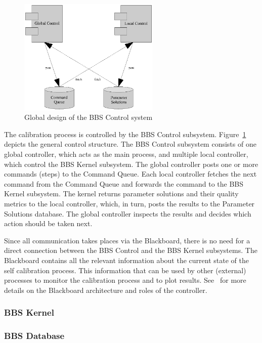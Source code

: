 \documentclass[10pt]{lofar}
\begin{document}
\begin{figure}[!ht]
\centering
\includegraphics[width=0.6\textwidth]{images/bbs-control-global-design}
\caption{Global design of the BBS Control system}
\label{fig:bbs-control-global-design}
\end{figure}

The calibration process is controlled by the BBS Control
subsystem. Figure~\ref{fig:bbs-control-global-design} depicts the general
control structure. The BBS Control subsystem consists of one global
controller, which acts as the main process, and multiple local controller,
which control the BBS Kernel subsystem. The global controller posts one or
more commands (steps) to the Command Queue. Each local controller fetches the
next command from the Command Queue and forwards the command to the BBS Kernel
subsystem. The kernel returns parameter solutions and their quality metrics to
the local controller, which, in turn, posts the results to the Parameter
Solutions database. The global controller inspects the results and decides
which action should be taken next.

Since all communication takes places via the Blackboard, there is no need for
a direct connection between the BBS Control and the BBS Kernel subsystems.
The Blackboard contains all the relevant information about the current state
of the self calibration process. This information that can be used by other
(external) processes to monitor the calibration process and to plot results.
See~\cite{LOFAR-ASTRON-SDD-002} for more details on the Blackboard
architecture and roles of the controller.


\subsubsection{BBS Kernel}
\label{subsubsec:sys-kernel}

\subsubsection{BBS Database}
\label{subsubsec:sys-database}
\end{document}
